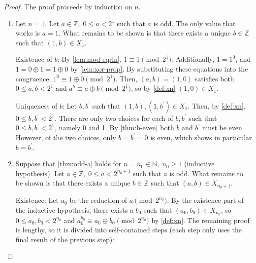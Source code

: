 \documentclass[1gpt]{article}
\theoremstyle{break}
\newcommand{\xor}{\oplus}
\begin{document}
\begin{proof}

    The proof proceeds by induction on $n$.

    \begin{enumerate}

        \item

            Let $n = 1$. Let $a \in \mathbb{Z},\; 0 \leq a < 2^1$ such that $a$
            is odd. The only value that works is $a=1$. What remains to be
            shown is that there exists a unique $b \in \mathbb{Z}$ such that
            $(1, b) \in X_1$.

            Existence of $b$: By \ref{lem:mod-eqrln}, $1 \equiv 1 \pmod{2^1}$.
            Additionally, $1 = 1^0$, and $1 = 0 \xor 1 = 1 \xor 0$ by
            \ref{lem:xor-prop}. By substituting these equations into the
            congruence, $1^0 \equiv 1 \xor 0 \pmod{2^1}$. Then, $(a, b) = (1,
            0)$ satisfies both $0 \leq a,b < 2^1$ and $a^b \equiv a \xor b
            \pmod{2^1}$, so by \ref{def:xn} $(1, 0) \in X_1$.

            Uniqueness of $b$: Let $b, b^\prime$ such that $(1, b), (1,
            b^\prime) \in X_1$. Then, by \ref{def:xn}, $0 \leq b, b^\prime <
            2^1$. There are only two choices for each of $b, b^\prime$ such
            that $0 \leq b, b^\prime < 2^1$, namely 0 and 1. By
            \ref{thm:b-even} both $b$ and $b^\prime$ must be even. However, of
            the two choices, only $b = b^\prime = 0$ is even, which shows in
            particular $b = b^\prime$.

        \item

            Suppose that \ref{thm:odd-a} holds for $n = n_0 \in \mathbb{N},\;
            n_0 \geq 1$ (inductive hypothesis). Let $a \in \mathbb{Z},\; 0 \leq
            a < 2^{n_0+1}$ such that $a$ is odd. What remains to be shown is
            that there exists a unique $b \in \mathbb{Z}$ such that $(a, b) \in
            X_{n_0+1}$.

            Existence: Let $a_0$ be the reduction of $a \pmod{2^{n_0}}$. By the
            existence part of the inductive hypothesis, there exists a $b_0$
            such that $(a_0, b_0) \in X_{n_0}$, so $0 \leq a_0, b_0 < 2^{n_0}$
            and $a_0^{b_0} \equiv a_0 \xor b_0 \pmod{2^{n_0}}$ by \ref{def:xn}.
            The remaining proof is lengthy, so it is divided into
            self-contained steps (each step only uses the final result of the
            previous step):


\end{enumerate}
\end{proof}
\end{document}

